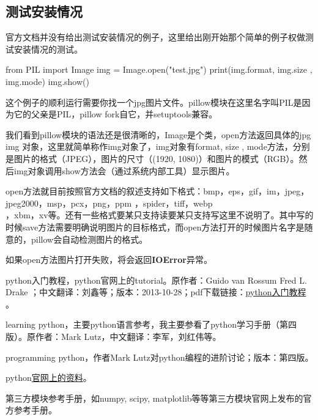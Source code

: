 \documentclass[12pt,oneside]{book}
\begin{document}
\begin{common-format}
\subsection{测试安装情况}
官方文档并没有给出测试安装情况的例子，这里给出刚开始那个简单的例子权做测试安装情况的测试。

\begin{tcbpython}[]
from PIL import Image
img = Image.open("test.jpg")
print(img.format, img.size , img.mode)
img.show()
\end{tcbpython}

这个例子的顺利运行需要你找一个jpg图片文件。pillow模块在这里名字叫PIL是因为它的父亲是PIL，pillow fork自它，并setuptools兼容。

我们看到pillow模块的语法还是很清晰的，Image是个类，open方法返回具体的jpg img 对象，这里就简单称作img对象了，img对象有format, size , mode方法，分别是图片的格式（JPEG），图片的尺寸（(1920, 1080)）和图片的模式（RGB）。然后img对象调用show方法会（通过系统内部工具）显示图片。

open方法就目前按照官方文档的叙述支持如下格式：bmp，eps，gif，im，jpeg，jpeg2000，msp，pcx，png，ppm ，spider，tiff，webp\\ ，xbm，xv等。还有一些格式要某只支持读要某只支持写这里不说明了。其中写的时候save方法需要明确说明图片的目标格式，而open方法打开的时候图片名字是随意的，pillow会自动检测图片的格式。

如果open方法图片打开失败，将会返回\textbf{IOError}异常。





\begin{thebibliography}{9}
 python入门教程，python官网上的tutorial。原作者：Guido van Rossum  Fred L. Drake ；中文翻译：刘鑫等；版本：2013-10-28；pdf下载链接：\href{https://drive.google.com/open?id=0ByWxOeitx54PSW40bU5zNVhuMlU&authuser=0}{python入门教程}  。

 learning python，主要python语言参考，我主要参看了python学习手册（第四版）。原作者：Mark Lutz，中文翻译：李军，刘红伟等。

 programming python，作者Mark Lutz对python编程的进阶讨论；版本：第四版。

 python\href{https://docs.python.org/3/}{官网上的资料}。

 第三方模块参考手册，如numpy, scipy, matplotlib等等第三方模块官网上发布的官方参考手册。


\end{thebibliography}
\end{common-format}
\end{document}
